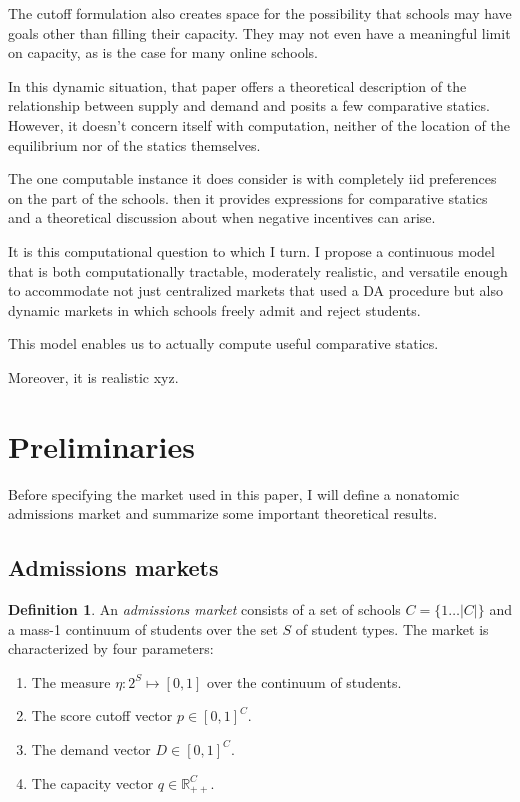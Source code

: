 \documentclass[12pt]{article}
\theoremstyle{definition}
\newtheorem{definition}{Definition}
\begin{document}
The cutoff formulation also creates space for the possibility that schools may have goals other than filling their capacity. They may not even have a meaningful limit on capacity, as is the case for many online schools.

In this dynamic situation, that paper offers a theoretical description of the relationship between supply and demand and posits a few comparative statics. However, it doesn't concern itself with computation, neither of the location of the equilibrium nor of the statics themselves. 

The one computable instance it does consider is with completely iid preferences on the part of the schools. then it provides expressions for comparative statics and a theoretical discussion about when negative incentives can arise.

It is this computational question to which I turn. I propose a continuous model that is both computationally tractable, moderately realistic, and versatile enough to accommodate not just centralized markets that used a DA procedure but also dynamic markets in which schools freely admit and reject students.

This model enables us to actually compute useful comparative statics. 

Moreover, it is realistic xyz.

\section{Preliminaries}
Before specifying the market used in this paper, I will define a nonatomic admissions market and summarize some important theoretical results.

\subsection{Admissions markets}
\begin{definition} An \emph{admissions market} consists of a set of schools $C = \{ 1\dots |C| \}$ and a mass-1 continuum of students over the set $S$ of student types. The market is characterized by four parameters:
\begin{enumerate}
\item The measure $\eta: 2^S \mapsto [0, 1]$ over the continuum of students.
\item The score cutoff vector $p \in [0, 1]^C$. 
\item The demand vector $D \in [0, 1]^C$.
\item The capacity vector $q \in \mathbb{R}_{++}^C$.
\end{enumerate}
\end{definition}
\end{document}
